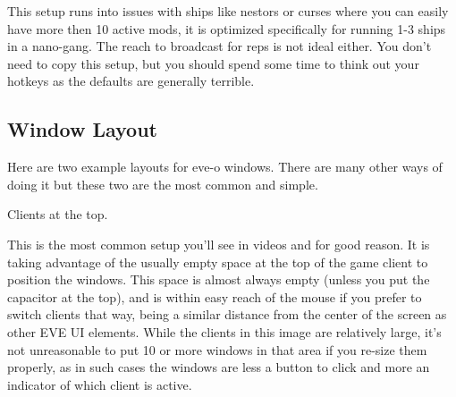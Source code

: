 \documentclass{article}
\begin{document}
This setup runs into issues with ships like nestors or curses where you can easily have more then 10
 active mods, it is optimized specifically for running 1-3 ships in a nano-gang. The reach to broadcast
 for reps is not ideal either. You don't need to copy this setup, but you should spend some time to
 think out your hotkeys as the defaults are generally terrible.

\clearpage
\subsection{Window Layout}

Here are two example layouts for eve-o windows. There are many other ways of doing it but these two are the most common and simple.
\\
\begin{center}
  Clients at the top.
\end{center}
This is the most common setup you'll see in videos and for good reason. It is taking advantage of the usually empty space at the top 
of the game client to position the windows. This space is almost always empty (unless you put the capacitor at the top), and is within 
easy reach of the mouse if you prefer to switch clients that way, being a similar distance from the center of the screen as other EVE 
UI elements. While the clients in this image are relatively large, it's not unreasonable to put 10 or more windows in that area if you 
re-size them properly, as in such cases the windows are less a button to click and more an indicator of which client is active. 
\end{document}
